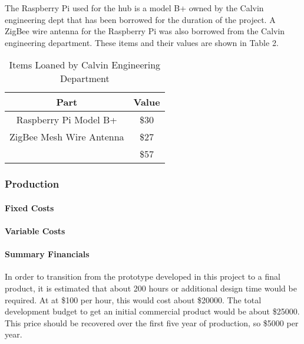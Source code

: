 \documentclass[PPFS.tex]{template/subfiles}
\begin{document}
        The Raspberry Pi used for the hub is a model B+ owned by the Calvin engineering dept that has been borrowed for the duration of the project. A ZigBee wire antenna for the Raspberry Pi was also borrowed from the Calvin engineering department. These items and their values are shown in Table 2.
        
        \begin{table}[h!]
        	\begin{center}
        		\caption{Items Loaned by Calvin Engineering Department}
        		\label{tab:table2}
        		\begin{tabular}{|c|c|}
        			\hline
        			Part & Value\\
        			\hline
        			Raspberry Pi Model B+ & \$30 \\
        			\hline
        			ZigBee Mesh Wire Antenna & \$27 \\
        			\hline
        			& \$57\\
        			\hline
        		\end{tabular}
        	\end{center}
        \end{table}
        \subsubsection{Production}
        \paragraph{Fixed Costs}	%
        \paragraph{Variable Costs}
        \paragraph{Summary Financials}
        
        In order to transition from the prototype developed in this project to a final product, it is estimated that about 200 hours or additional design time would be required. At at \$100 per hour, this would cost about \$20000. The total development budget to get an initial commercial product would be about \$25000. This price should be recovered over the first five year of production, so \$5000 per year.
        
\end{document}
